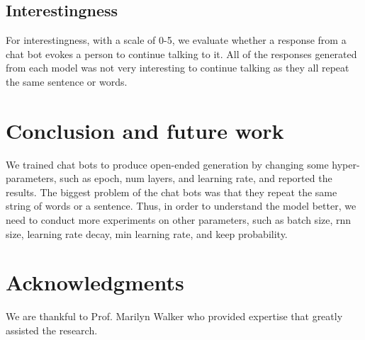 \documentclass[11pt,a4paper]{article}
\begin{document}
\subsection{Interestingness}

For interestingness, with a scale of 0-5, we evaluate whether a response from a chat bot evokes a person to continue talking to it. All of the responses generated from each model was not very interesting to continue talking as they all repeat the same sentence or words.  



\section{Conclusion and future work}

We trained chat bots to produce open-ended generation by changing some hyper-parameters, such as epoch, num layers, and learning rate, and reported the results. The biggest problem of the chat bots was that they repeat the same string of words or a sentence. Thus, in order to understand the model better, we need to conduct more experiments on other parameters, such as batch size, rnn size, learning rate decay, min learning rate, and keep probability.





\section*{Acknowledgments}
We are thankful to Prof. Marilyn Walker who provided expertise that greatly assisted the research.

%
%


\end{document}
